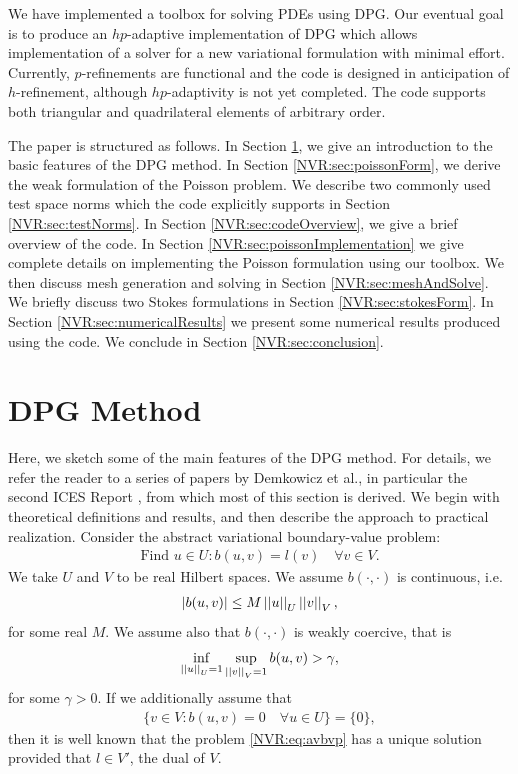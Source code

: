 We have implemented a toolbox for solving PDEs using DPG.  Our eventual goal is to produce an $hp$-adaptive implementation of DPG which allows implementation of a solver for a new variational formulation with minimal effort.  Currently, $p$-refinements are functional and the code is designed in anticipation of $h$-refinement, although $hp$-adaptivity is not yet completed.  The code supports both triangular and quadrilateral elements of arbitrary order.

The paper is structured as follows.  In Section \ref{NVR:sec:DPGintro}, we give an introduction to the basic features of the DPG method.  In Section \ref{NVR:sec:poissonForm}, we derive the weak formulation of the Poisson problem.  We describe two commonly used test space norms which the code explicitly supports in Section \ref{NVR:sec:testNorms}.  In Section \ref{NVR:sec:codeOverview}, we give a brief overview of the code.  In Section \ref{NVR:sec:poissonImplementation} we give complete details on implementing the Poisson formulation using our toolbox.  We then discuss mesh generation and solving in Section \ref{NVR:sec:meshAndSolve}.  We briefly discuss two Stokes formulations in Section \ref{NVR:sec:stokesForm}.  In Section \ref{NVR:sec:numericalResults} we present some numerical results produced using the code.  We conclude in Section \ref{NVR:sec:conclusion}.

\section{DPG Method}\label{NVR:sec:DPGintro}
Here, we sketch some of the main features of the DPG method.  For details, we refer the reader to a series of papers by Demkowicz et al., in particular the second ICES Report \cite{DPG2}, from which most of this section is derived.  We begin with theoretical definitions and results, and then describe the approach to practical realization.  Consider the abstract variational boundary-value problem:
\begin{align}
\text{Find } u \in U : b(u,v) = l(v) \quad \forall v \in V.\label{NVR:eq:avbvp}
\end{align}
We take $U$ and $V$ to be real Hilbert spaces.  We assume $b(\cdot,\cdot)$ is continuous, i.e.\
\begin{align}
|b(u,v)| \leq M \norm{u}_{U} \norm{v}_{V},
\end{align}
for some real $M$. We assume also that $b(\cdot,\cdot)$ is weakly coercive, that is
\begin{align}
\inf_{\norm{u}_{U}=1} \sup_{\norm{v}_{V}=1} b(u,v) > \gamma,
\end{align}
for some $\gamma > 0$.  If we additionally assume that
\begin{align}
\{v \in V : b(u,v)=0 \quad \forall u \in U\} = \{0\},
\end{align}
then it is well known that the problem \eqref{NVR:eq:avbvp} has a unique solution provided that $l \in V'$, the dual of $V$.

